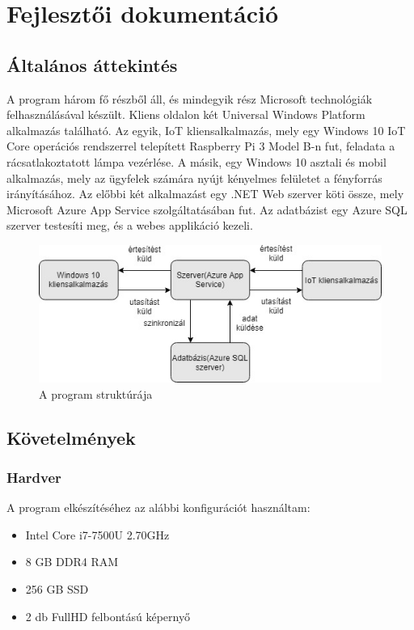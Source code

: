 \documentclass[a4paper,12pt]{report}
\begin{document}
\chapter{Fejlesztői dokumentáció}

\section{Általános áttekintés}
    A program három fő részből áll, és mindegyik rész Microsoft technológiák felhasználásával készült. Kliens oldalon két
    Universal Windows Platform alkalmazás található. Az egyik, IoT kliensalkalmazás, mely egy Windows 10 IoT Core operációs rendszerrel
    telepített Raspberry Pi 3 Model B-n fut, feladata a rácsatlakoztatott lámpa vezérlése. A másik, egy Windows 10 asztali és mobil
    alkalmazás, mely az ügyfelek számára nyújt kényelmes felületet a fényforrás irányításához. Az előbbi két alkalmazást egy .NET Web
    szerver köti össze, mely Microsoft Azure App Service szolgáltatásában fut. Az adatbázist egy Azure SQL szerver testesíti meg, és a webes
    applikáció kezeli.

\begin{figure}[H]
    \centering
    \includegraphics[width=\linewidth]{images/struktura.jpg}
    \caption{A program struktúrája}
    \label{fig: Struktura}
\end{figure}

\section{Követelmények}

\subsection{Hardver}
    A program elkészítéséhez az alábbi konfigurációt használtam:

\begin{itemize}
    \item Intel Core i7-7500U 2.70GHz
    \item 8 GB DDR4 RAM
    \item 256 GB SSD
    \item 2 db FullHD felbontású képernyő
\end{itemize}
\end{document}
